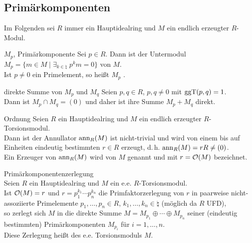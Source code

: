 \subsection{%
    Primärkomponenten%
}

\begin{Bem}
    Im Folgenden sei $R$ immer ein Hauptidealring und $M$ ein endlich erzeugter
    $R$-Modul.
\end{Bem}

\begin{Def}{$M_p$, Primärkomponente}
    Sei $p \in R$.
    Dann ist  der Untermodul \\
    $M_p = \{m \in M \;|\; \exists_{k \in \natural}\; p^k m = 0\}$ von $M$. \\
    Ist $p \not= 0$ ein Primelement, so heißt $M_p$ .
\end{Def}

\begin{Lemma}{direkte Summe von $M_p$ und $M_q$}
    Seien $p, q \in R$, $p, q \not= 0$ mit $\operatorname{ggT}(p, q) = 1$. \\
    Dann ist $M_p \cap M_q = (0)$ und daher ist ihre Summe $M_p + M_q$ direkt.
\end{Lemma}

\begin{Def}{Ordnung}
    Seien $R$ ein Hauptidealring und $M$ ein endlich erzeugter
    $R$-Torsionsmodul. \\
    Dann ist der Annullator $\operatorname{ann}_R(M)$ ist nicht-trivial und wird von einem
    bis auf Einheiten eindeutig bestimmten $r \in R$ erzeugt, d.\,h.
    $\operatorname{ann}_R(M) = rR \not= (0)$. \\
    Ein Erzeuger von $\operatorname{ann}_R(M)$ wird  von $M$
    genannt und mit $r = \mathcal{O}(M)$ bezeichnet.
\end{Def}

\begin{Satz}{Primärkomponentenzerlegung} \\
    Seien $R$ ein Hauptidealring und $M$ ein e.e.
    $R$-Torsionsmodul. \\
    Ist $\mathcal{O}(M) = r$ und $r = p_1^{k_1} \dotsm p_n^{k_n}$ die
    Primfaktorzerlegung von $r$ in paarweise nicht-assoziierte
    Primelemente $p_1, \dotsc, p_n \in R$, $k_1, \dotsc, k_n \in \natural$
    (möglich da $R$ UFD), \\
    so zerlegt sich $M$ in die direkte Summe
    $M = M_{p_1} \oplus \dotsb \oplus M_{p_n}$
    seiner (eindeutig bestimmten) Primärkomponenten $M_{p_i}$ für
    $i = 1, \dotsc, n$. \\
    Diese Zerlegung heißt  des
    e.e. Torsionsmoduls $M$.
\end{Satz}

